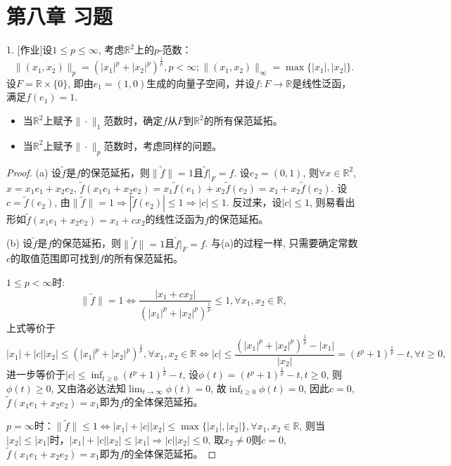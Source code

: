 \documentclass[a4paper,8pt]{ctexart}\textwidth 140mm \textheight 216mm
\newcommand{\8}{\infty}
\newcommand{\RA}{\Rightarrow}
\begin{document}
\section{第八章 习题}
1. [作业]设$1\leq p\leq\infty$, 考虑$\mathbb{R}^2$上的$p$-范数：
$$\|(x_1,x_2)\|_p=(|x_1|^p+|x_2|^p)^{\frac{1}{p}},p<\infty;\|(x_1,x_2)\|_\infty=\max\{|x_1|,|x_2|\}.$$
设$F=\mathbb{R}\times\{0\}$, 即由$e_1=(1,0)$生成的向量子空间，并设$f:F\to\mathbb{R}$是线性泛函，满足$f(e_1)=1$.
\begin{itemize}
	\item[(a)] 当$\mathbb{R}^2$上赋予$\|\cdot\|_1$范数时，确定$f$从$F$到$\mathbb{R}^2$的所有保范延拓。
	\item[(b)]当$\mathbb{R}^2$上赋予$\|\cdot\|_p$范数时，考虑同样的问题。
\end{itemize}
\begin{proof}
	(a) 设$\tilde{f}$是$f$的保范延拓，则$\|\tilde{f}\|=1$且$\tilde{f}|_F=f$. 设$e_2=(0,1)$, 则$\forall x\in\mathbb{R}^2$, $x=x_1e_1+x_2e_2$, $\tilde{f}(x_1e_1+x_2e_2)=x_1\tilde{f}(e_1)+x_2\tilde{f}(e_2)=x_1+x_2\tilde{f}(e_2)$. 设$c=\tilde{f}(e_2)$, 由$\|\tilde{f}\|=1\RA|\tilde{f}(e_2)|\leq 1\RA|c|\leq 1$. 反过来，设$|c|\leq 1$, 则易看出形如$\tilde{f}(x_1e_1+x_2e_2)=x_1+cx_2$的线性泛函为$f$的保范延拓。
	
	(b) 设$\tilde{f}$是$f$的保范延拓，则$\|\tilde{f}\|=1$且$\tilde{f}|_F=f$. 与(a)的过程一样, 只需要确定常数$c$的取值范围即可找到$f$的所有保范延拓。
	
	$1\leq p<\infty$时: 
	$$\|\tilde{f}\|=1\Leftrightarrow \frac{|x_1+cx_2|}{(|x_1|^p+|x_2|^p)^{\frac{1}{p}}}\leq 1,\forall x_1,x_2\in \mathbb{R},$$
	上式等价于$$|x_1|+|c||x_2|\leq (|x_1|^p+|x_2|^p)^{\frac{1}{p}},\forall x_1,x_2\in \mathbb{R}\Leftrightarrow |c|\leq \frac{(|x_1|^p+|x_2|^p)^{\frac{1}{p}}-|x_1|}{|x_2|}=(t^p+1)^{\frac{1}{p}}-t,\forall t\geq 0,$$
	进一步等价于$|c|\leq \inf_{t\geq 0}(t^p+1)^{\frac{1}{p}}-t$, 设$\phi(t)=(t^p+1)^{\frac{1}{p}}-t,t\geq 0$, 则$\phi(t)\geq 0$, 又由洛必达法知$\lim_{t\to\infty}\phi(t)=0$, 故$\inf_{t\geq 0}\phi(t)=0$, 因此$c=0$, $\tilde{f}(x_1e_1+x_2e_2)=x_1$即为$f$的全体保范延拓。
	
	$p=\infty$时：$\|\tilde{f}\|\leq 1\Leftrightarrow |x_1|+|c||x_2|\leq \max\{|x_1|,|x_2|\},\forall x_1,x_2\in\mathbb{R}$, 则当$|x_2|\leq|x_1|$时，$|x_1|+|c||x_2|\leq|x_1|\RA |c||x_2|\leq 0$, 取$x_2\ne 0$则$c=0$, $\tilde{f}(x_1e_1+x_2e_2)=x_1$即为$f$的全体保范延拓。
\end{proof}
\end{document}
